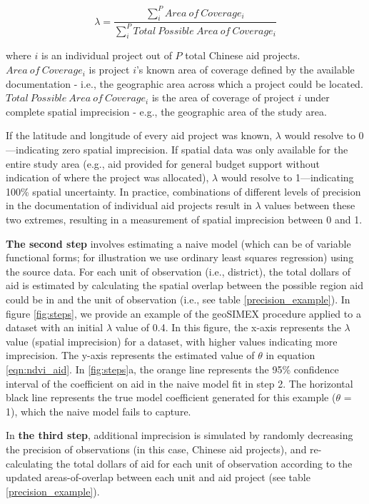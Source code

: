 \begin{equation}\label{lambda}
\lambda = \frac{\sum_{i}^{P}Area \ of \ Coverage_i}{\sum_{i}^{P}Total \ Possible \ Area \ of \ Coverage_i}
\end{equation}

\noindent where $i$ is an individual project out of $P$ total Chinese aid projects. 
$Area \ of \ Coverage_i$ is project $i$'s known area of coverage defined by the available documentation - i.e., the geographic area across which a project could be located. 
$Total \ Possible \ Area \ of \ Coverage_i$ is the area of coverage of project $i$ under complete spatial imprecision - e.g., the geographic area of the study area.
\par
If the latitude and longitude of every aid project was known, $\lambda$ would resolve to 0---indicating zero spatial imprecision. 
If spatial data was only available for the entire study area (e.g., aid provided for general budget support without indication of where the project was allocated), $\lambda$ would resolve to 1---indicating 100\% spatial uncertainty. 
In practice, combinations of different levels of precision in the documentation of individual aid projects result in $\lambda$ values between these two extremes, resulting in a measurement of spatial imprecision between 0 and 1.
\par
\textbf{The second step} involves estimating a naive model (which can be of variable functional forms; for illustration we use ordinary least squares regression) using the source data.
For each unit of observation (i.e., district), the total dollars of aid is estimated by calculating the spatial overlap between the possible region aid could be in and the unit of observation (i.e., see table \ref{precision_example}).
In figure \ref{fig:steps}, we provide an example of the geoSIMEX procedure applied to a dataset with an initial $\lambda$ value of 0.4.
In this figure, the x-axis represents the $\lambda$ value (spatial imprecision) for a dataset, with higher values indicating more imprecision.
The y-axis represents the estimated value of $\theta$ in equation \ref{eqn:ndvi_aid}.
In \ref{fig:steps}a, the orange line represents the 95\% confidence interval of the coefficient on aid in the naive model fit in step 2. 
The horizontal black line represents the true model coefficient generated for this example ($\theta$ = 1), which the naive model fails to capture.
\par 
In \textbf{the third step}, additional imprecision is simulated by randomly decreasing the precision of observations (in this case, Chinese aid projects), and re-calculating the total dollars of aid for each unit of observation according to the updated areas-of-overlap between each unit and aid project (see table \ref{precision_example}). 
